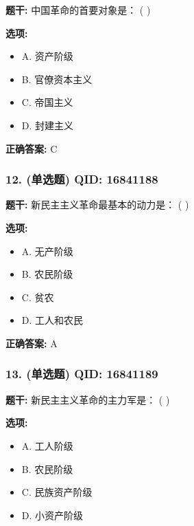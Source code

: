 \documentclass[12pt,UTF8]{ctexart}
\begin{document}
\textbf{题干:}
中国革命的首要对象是： ( )

\textbf{选项:}
\begin{itemize}[leftmargin=*]

  \item A. 资产阶级

  \item B. 官僚资本主义

  \item C. 帝国主义

  \item D. 封建主义

\end{itemize}

\textbf{正确答案:}
C

\vspace{0.3em}\hrulefill\vspace{0.7em}

\subsubsection*{12. (单选题) \small QID: 16841188}

\textbf{题干:}
新民主主义革命最基本的动力是： ( )

\textbf{选项:}
\begin{itemize}[leftmargin=*]

  \item A. 无产阶级

  \item B. 农民阶级

  \item C. 贫农

  \item D. 工人和农民

\end{itemize}

\textbf{正确答案:}
A

\vspace{0.3em}\hrulefill\vspace{0.7em}

\subsubsection*{13. (单选题) \small QID: 16841189}

\textbf{题干:}
新民主主义革命的主力军是： ( )

\textbf{选项:}
\begin{itemize}[leftmargin=*]

  \item A. 工人阶级

  \item B. 农民阶级

  \item C. 民族资产阶级

  \item D. 小资产阶级

\end{itemize}
\end{document}
